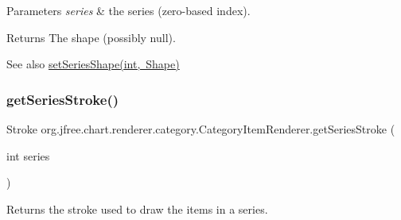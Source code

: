 \begin{DoxyParams}{Parameters}
{\em series} & the series (zero-\/based index).\\
\hline
\end{DoxyParams}
\begin{DoxyReturn}{Returns}
The shape (possibly {\ttfamily null}).
\end{DoxyReturn}
\begin{DoxySeeAlso}{See also}
\mbox{\hyperlink{interfaceorg_1_1jfree_1_1chart_1_1renderer_1_1category_1_1_category_item_renderer_abf0baf3c766531b4be3a3f830d6f4685}{set\+Series\+Shape(int, Shape)}} 
\end{DoxySeeAlso}
\mbox{\label{interfaceorg_1_1jfree_1_1chart_1_1renderer_1_1category_1_1_category_item_renderer_a4a3ff6564fafaf686b0cf73b564fabff}} 
\subsubsection{\texorpdfstring{get\+Series\+Stroke()}{getSeriesStroke()}}
{\footnotesize\ttfamily Stroke org.\+jfree.\+chart.\+renderer.\+category.\+Category\+Item\+Renderer.\+get\+Series\+Stroke (\begin{DoxyParamCaption}\item[{int}]{series }\end{DoxyParamCaption})}

Returns the stroke used to draw the items in a series.


